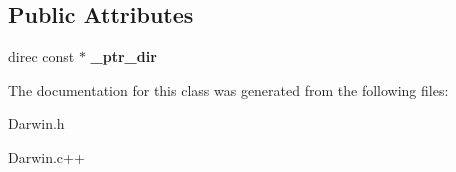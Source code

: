 \subsection*{Public Attributes}
\begin{DoxyCompactItemize}
\item 
\hypertarget{class_creature_a0ec9026deb607edac506721ad1db7367}{direc const $\ast$ {\bfseries \-\_\-ptr\-\_\-dir}}\label{class_creature_a0ec9026deb607edac506721ad1db7367}

\end{DoxyCompactItemize}


The documentation for this class was generated from the following files\-:\begin{DoxyCompactItemize}
\item 
Darwin.\-h\item 
Darwin.\-c++\end{DoxyCompactItemize}
